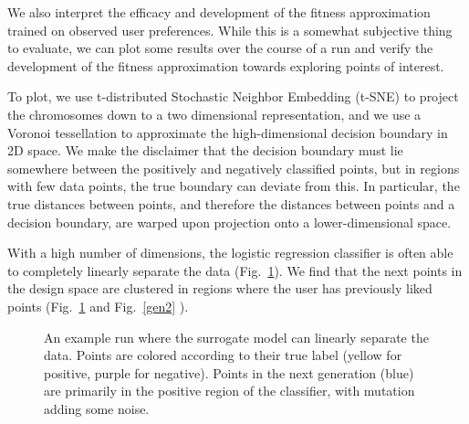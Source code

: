 \documentclass[conference]{IEEEtran}
\begin{document}
We also interpret the efficacy and development of the fitness approximation
trained on observed user preferences. While this is a somewhat subjective thing
to evaluate, we can plot some results over the course of a run and verify the
development of the fitness approximation towards exploring points of interest.

To plot, we use t-distributed Stochastic Neighbor Embedding (t-SNE)
\cite{tsne} to project the chromosomes down to a two dimensional
representation, and we use a Voronoi tessellation \cite{hi-d-viz} to
approximate the high-dimensional decision boundary in 2D space. We make the
disclaimer that the decision boundary must lie somewhere between the positively
and negatively classified points, but in regions with few data points, the true
boundary can deviate from this. In particular, the true distances between
points, and therefore the distances between points and a decision boundary, are
warped upon projection onto a lower-dimensional space.

With a high number of dimensions, the logistic regression classifier is often
able to completely linearly separate the data (Fig.~\ref{gen1}).
We find that the next points in the design space are clustered in regions where
the user has previously liked points (Fig.~\ref{gen1} and
Fig.~\ref{gen2} ).

\begin{figure}[htbp]
    \caption{An example run where the surrogate model can linearly separate the data.
        Points are colored according to their true label (yellow for
        positive, purple for negative). Points in the next generation (blue) are primarily in the
        positive
        region of the
        classifier, with mutation adding some noise.}
    \label{gen1}
\end{figure}
\end{document}
